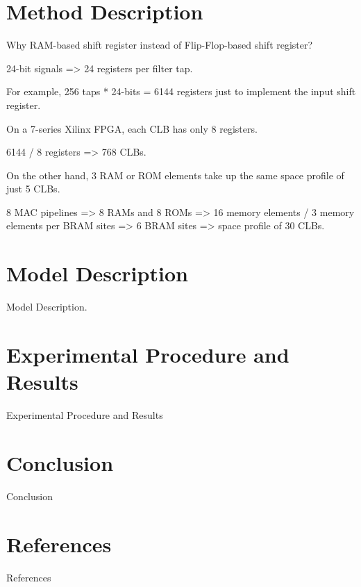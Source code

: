 \documentclass{article}
\begin{document}
\section{Method Description}
    Why RAM-based shift register instead of Flip-Flop-based shift register?

    24-bit signals => 24 registers per filter tap.

    For example, 256 taps * 24-bits = 6144 registers just to implement the input shift register.

    On a 7-series Xilinx FPGA, each CLB has only 8 registers. 

    6144 / 8 registers => 768 CLBs.

    On the other hand, 3 RAM or ROM elements take up the same space profile of just 5 CLBs.

    8 MAC pipelines => 8 RAMs and 8 ROMs => 16 memory elements / 3 memory elements per BRAM sites => 6 BRAM sites => space profile of 30 CLBs.


\section{Model Description}
    Model Description.

\section{Experimental Procedure and Results}
    Experimental Procedure and Results

\section{Conclusion}
    Conclusion

\section{References}
    References
\end{document}
